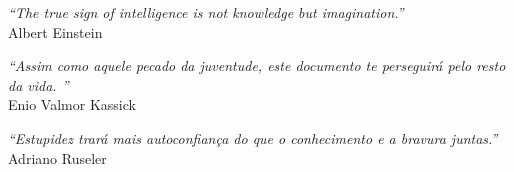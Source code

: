 
\begin{epigrafe}

\vspace*{\fill}\lang
{
    \begin{flushright}
        \textit{``The true sign of intelligence is not knowledge but imagination.''} \\  Albert Einstein
    \end{flushright}
}
{
    \begin{flushright}
        \textit{``Assim como aquele pecado da juventude, este documento te perseguirá pelo resto da vida.  ''} \\ Enio Valmor Kassick
    \end{flushright}
    \begin{flushright}
        \textit{``Estupidez trará mais autoconfiança do que o conhecimento e a bravura juntas.''} \\ Adriano Ruseler
    \end{flushright}
}

\end{epigrafe}


